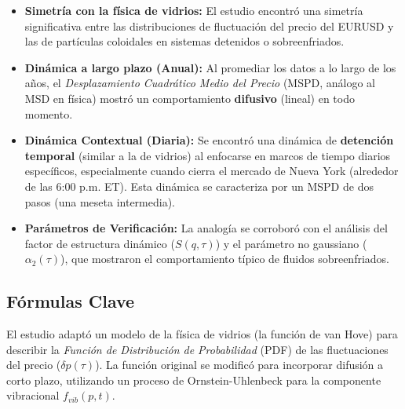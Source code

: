 \documentclass[12pt,a4paper]{article}
\begin{document}
\begin{itemize}
    \item \textbf{Simetría con la física de vidrios:} El estudio encontró una simetría significativa entre las distribuciones de fluctuación del precio del EURUSD y las de partículas coloidales en sistemas detenidos o sobreenfriados.
    \item \textbf{Dinámica a largo plazo (Anual):} Al promediar los datos a lo largo de los años, el \emph{Desplazamiento Cuadrático Medio del Precio} (MSPD, análogo al MSD en física) mostró un comportamiento \textbf{difusivo} (lineal) en todo momento.
    \item \textbf{Dinámica Contextual (Diaria):} Se encontró una dinámica de \textbf{detención temporal} (similar a la de vidrios) al enfocarse en marcos de tiempo diarios específicos, especialmente cuando cierra el mercado de Nueva York (alrededor de las 6:00 p.m. ET). Esta dinámica se caracteriza por un MSPD de dos pasos (una meseta intermedia).
    \item \textbf{Parámetros de Verificación:} La analogía se corroboró con el análisis del factor de estructura dinámico ($S(q, \tau)$) y el parámetro no gaussiano ($\alpha_2(\tau)$), que mostraron el comportamiento típico de fluidos sobreenfriados.
\end{itemize}

\subsection*{Fórmulas Clave}

El estudio adaptó un modelo de la física de vidrios (la función de van Hove) para describir la \emph{Función de Distribución de Probabilidad} (PDF) de las fluctuaciones del precio ($\delta p(\tau)$). La función original se modificó para incorporar difusión a corto plazo, utilizando un proceso de Ornstein-Uhlenbeck para la componente vibracional $f_{vib}(p, t)$.
\end{document}
